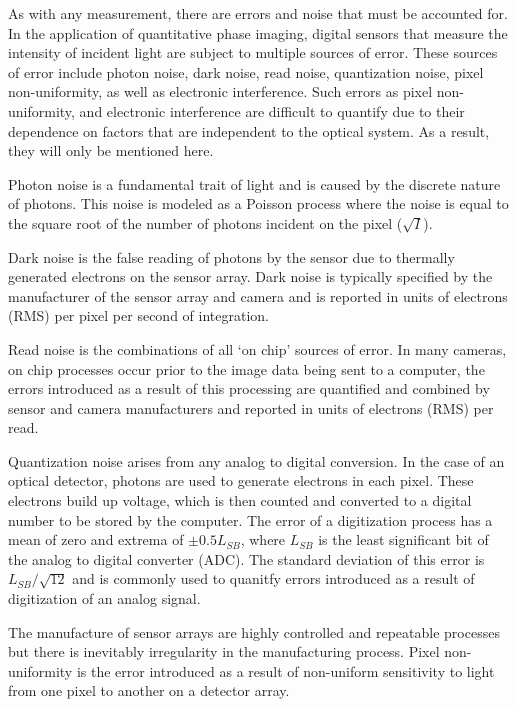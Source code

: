 \documentclass[10pt,letterpaper]{article}
\begin{document}
As with any measurement, there are errors and noise that must be accounted for. In the application of quantitative phase imaging, digital sensors that measure the intensity of incident light are subject to multiple sources of error. These sources of error include photon noise, dark noise, read noise, quantization noise, pixel non-uniformity, as well as electronic interference. Such errors as pixel non-uniformity, and electronic interference are difficult to quantify due to their dependence on factors that are independent to the optical system. As a result, they will only be mentioned here.\par

Photon noise is a fundamental trait of light and is caused by the discrete nature of photons. This noise is modeled as a Poisson process where the noise is equal to the square root of the number of photons incident on the pixel ($\sqrt{I}$).

Dark noise is the false reading of photons by the sensor due to thermally generated electrons on the sensor array. Dark noise is typically specified by the manufacturer of the sensor array and camera and is reported in units of electrons (RMS) per pixel per second of integration.\par

Read noise is the combinations of all `on chip' sources of error. In many cameras, on chip processes occur prior to the image data being sent to a computer, the errors introduced as a result of this processing are quantified and combined by sensor and camera manufacturers and reported in units of electrons (RMS) per read.\par

Quantization noise arises from any analog to digital conversion. In the case of an optical detector, photons are used to generate electrons in each pixel. These electrons build up voltage, which is then counted and converted to a digital number to be stored by the computer. The error of a digitization process has a mean of zero and extrema of $\pm0.5L_{SB}$, where $L_{SB}$ is the least significant bit of the analog to digital converter (ADC). The standard deviation of this error is $L_{SB}/\sqrt{12}$ and is commonly used to quanitfy errors introduced as a result of digitization of an analog signal.

The manufacture of sensor arrays are highly controlled and repeatable processes but there is inevitably irregularity in the manufacturing process. Pixel non-uniformity is the error introduced as a result of non-uniform sensitivity to light from one pixel to another on a detector array.\par
\end{document}
